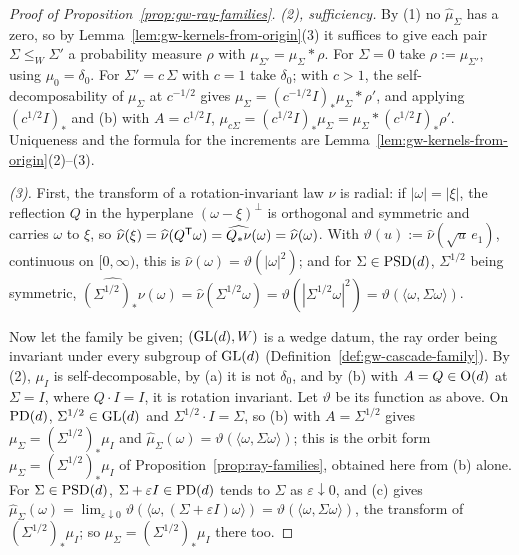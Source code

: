 \begin{proof}[Proof of Proposition~\ref{prop:gw-ray-families}]
\emph{(2), sufficiency.} By (1) no $\widehat\mu_\Sigma$ has a zero, so by
Lemma~\ref{lem:gw-kernels-from-origin}(3) it suffices to give each pair $\Sigma \le_W \Sigma'$ a probability
measure $\rho$ with $\mu_{\Sigma'} = \mu_\Sigma * \rho$. For $\Sigma = 0$ take $\rho := \mu_{\Sigma'}$,
using $\mu_0 = \delta_0$. For $\Sigma' = c\,\Sigma$ with $c = 1$ take $\delta_0$; with $c > 1$, the
self-decomposability of $\mu_\Sigma$ at $c^{-1/2}$ gives $\mu_\Sigma = (c^{-1/2}I)_*\mu_\Sigma * \rho'$, and
applying $(c^{1/2}I)_*$ and (b) with $A = c^{1/2}I$, $\mu_{c\Sigma} = (c^{1/2}I)_*\mu_\Sigma = \mu_\Sigma *
(c^{1/2}I)_*\rho'$. Uniqueness and the formula for the increments are
Lemma~\ref{lem:gw-kernels-from-origin}(2)--(3).

\emph{(3).} First, the transform of a rotation-invariant law $\nu$ is radial: if $|\omega| = |\xi|$, the
reflection $Q$ in the hyperplane $(\omega - \xi)^\perp$ is orthogonal and symmetric and carries $\omega$ to $\xi$,
so $\widehat\nu(\xi) = \widehat\nu(Q^{\mathsf{T}}\omega) = \widehat{Q_*\nu}(\omega) = \widehat\nu(\omega)$. With
$\vartheta(u) := \widehat\nu(\sqrt u\,e_1)$, continuous on $[0,\infty)$, this is $\widehat\nu(\omega) = \vartheta(|\omega|^2)$; and
for $\Sigma \in \mathrm{PSD}(d)$, $\Sigma^{1/2}$ being symmetric,
$\widehat{(\Sigma^{1/2})_*\nu}(\omega) = \widehat\nu(\Sigma^{1/2}\omega) = \vartheta(|\Sigma^{1/2}\omega|^2)
= \vartheta(\langle\omega,\Sigma\omega\rangle)$.

Now let the family be given; $(\mathrm{GL}(d), W)$ is a wedge datum, the ray order being invariant under every
subgroup of $\mathrm{GL}(d)$ (Definition~\ref{def:gw-cascade-family}). By (2), $\mu_I$ is self-decomposable, by
(a) it is not $\delta_0$, and by (b) with $A = Q \in \mathrm{O}(d)$ at $\Sigma = I$, where $Q \cdot I = I$, it
is rotation invariant. Let $\vartheta$ be its function as above. On $\mathrm{PD}(d)$, $\Sigma^{1/2} \in \mathrm{GL}(d)$ and
$\Sigma^{1/2}\cdot I = \Sigma$, so (b) with $A = \Sigma^{1/2}$ gives $\mu_\Sigma = (\Sigma^{1/2})_*\mu_I$
and $\widehat\mu_\Sigma(\omega) = \vartheta(\langle\omega,\Sigma\omega\rangle)$; this is the orbit form
$\mu_\Sigma = (\Sigma^{1/2})_*\mu_I$ of Proposition~\ref{prop:ray-families}, obtained here from (b) alone.
For $\Sigma \in \mathrm{PSD}(d)$, $\Sigma + \varepsilon I \in \mathrm{PD}(d)$ tends to $\Sigma$ as
$\varepsilon \downarrow 0$, and (c) gives $\widehat\mu_\Sigma(\omega) =
\lim_{\varepsilon\downarrow0}\vartheta(\langle\omega,(\Sigma + \varepsilon I)\omega\rangle) =
\vartheta(\langle\omega,\Sigma\omega\rangle)$, the transform of $(\Sigma^{1/2})_*\mu_I$; so
$\mu_\Sigma = (\Sigma^{1/2})_*\mu_I$ there too.


\end{proof}

